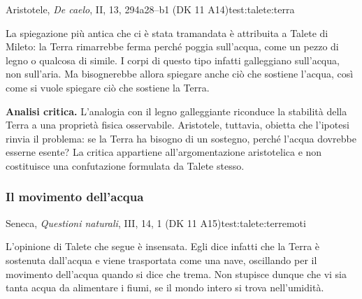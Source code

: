 \begin{testimonianza}{Aristotele, \emph{De caelo}, II, 13, 294a28--b1 (DK 11 A14)}{test:talete:terra}
\smallskip
{}\par
La spiegazione più antica che ci è stata tramandata è attribuita a Talete di Mileto: la Terra rimarrebbe ferma perché poggia sull'acqua, come un pezzo di legno o qualcosa di simile. I corpi di questo tipo infatti galleggiano sull'acqua, non sull'aria. Ma bisognerebbe allora spiegare anche ciò che sostiene l'acqua, così come si vuole spiegare ciò che sostiene la Terra.
\end{testimonianza}


\noindent\textbf{Analisi critica.}
L'analogia con il legno galleggiante riconduce la stabilità della Terra a una proprietà fisica osservabile. Aristotele, tuttavia, obietta che l'ipotesi rinvia il problema: se la Terra ha bisogno di un sostegno, perché l'acqua dovrebbe esserne esente? La critica appartiene all'argomentazione aristotelica e non costituisce una confutazione formulata da Talete stesso.

\subsubsection{Il movimento dell'acqua}

\begin{testimonianza}{Seneca, \emph{Questioni naturali}, III, 14, 1 (DK 11 A15)}{test:talete:terremoti}
\smallskip
{}\par
L'opinione di Talete che segue è insensata. Egli dice infatti che la Terra è sostenuta dall'acqua e viene trasportata come una nave, oscillando per il movimento dell'acqua quando si dice che trema. Non stupisce dunque che vi sia tanta acqua da alimentare i fiumi, se il mondo intero si trova nell'umidità.
\end{testimonianza}

